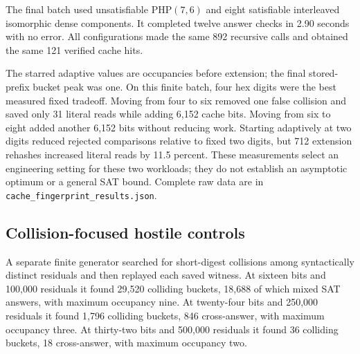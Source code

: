 \documentclass[11pt]{article}
\begin{document}
The final batch used unsatisfiable PHP$(7,6)$ and eight satisfiable
interleaved isomorphic dense components.  It completed twelve answer checks
in 2.90 seconds with no error.  All configurations made the same 892
recursive calls and obtained the same 121 verified cache hits.

\begin{center}
\end{center}
The starred adaptive values are occupancies before extension; the final
stored-prefix bucket peak was one.  On this finite batch, four hex digits were
the best measured fixed tradeoff.  Moving from four to six removed one false
collision and saved only 31 literal reads while adding 6,152 cache bits.
Moving from six to eight added another 6,152 bits without reducing work.
Starting adaptively at two digits reduced rejected comparisons relative to
fixed two digits, but 712 extension rehashes increased literal reads by 11.5
percent.  These measurements select an engineering setting for these two
workloads; they do not establish an asymptotic optimum or a general SAT
bound.  Complete raw data are in
\texttt{cache\_fingerprint\_results.json}.

\subsection{Collision-focused hostile controls}
A separate finite generator searched for short-digest collisions among
syntactically distinct residuals and then replayed each saved witness.  At
sixteen bits and 100,000 residuals it found 29,520 colliding buckets, 18,688
of which mixed SAT answers, with maximum occupancy nine.  At twenty-four bits
and 250,000 residuals it found 1,796 colliding buckets, 846 cross-answer,
with maximum occupancy three.  At thirty-two bits and 500,000 residuals it
found 36 colliding buckets, 18 cross-answer, with maximum occupancy two.
\end{document}
